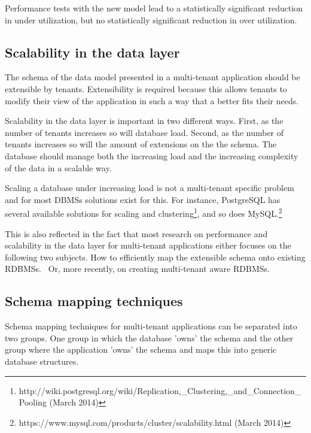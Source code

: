 Performance tests with the new model lead to a statistically significant reduction in under utilization, but no statistically significant reduction in over utilization.


\subsection{Scalability in the data layer}
The schema of the data model presented in a multi-tenant application should be extensible by tenants.
Extensibility is required because this allows tenants to modify their view of the application in such a way that a better fits their needs.

Scalability in the data layer is important in two different ways.
First, as the number of tenants increases so will database load.
Second, as the number of tenants increases so will the amount of extensions on the the schema. 
The database should manage both the increasing load and the increasing complexity of the data in a scalable way.

Scaling a database under increasing load is not a multi-tenant specific problem and for most \acp{DBMS} solutions exist for this. 
For instance, PostgreSQL has several available solutions for scaling and clustering\footnote{http://wiki.postgresql.org/wiki/Replication,\_Clustering,\_and\_Connection\_Pooling (March 2014)}, and so does MySQL.\footnote{https://www.mysql.com/products/cluster/scalability.html (March 2014)}

This is also reflected in the fact that most research on performance and scalability in the data layer for multi-tenant applications either focuses on the following two subjects.
How to efficiently map the extensible schema onto existing \acp{RDBMS}.~\cite{aulbach2008multi, aulbach2009comparison} 
Or, more recently, on creating multi-tenant aware \acp{RDBMS}.~\cite{schiller2011native, aulbach2011extensibility} 

\subsection{Schema mapping techniques}
Schema mapping techniques for multi-tenant applications can be separated into two groups. 
One group in which the database 'owns' the schema  and the other group where the application 'owns' the schema and maps this into generic database structures.~\cite{aulbach2009comparison}


